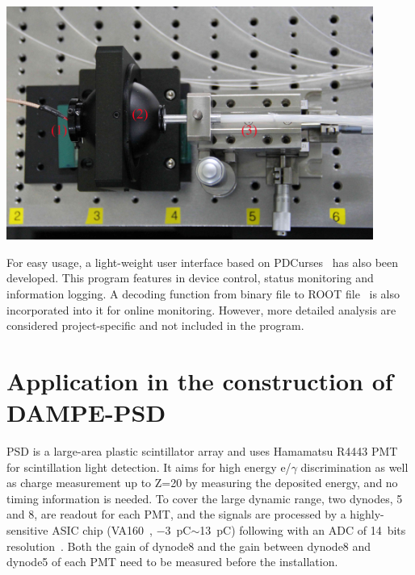 \documentclass[a4paper,10pt,twoside]{cpc-hepnp}
\begin{document}
\begin{CJK*}{UTF8}{gbsn}
\begin{multicols}{2}
\end{multicols}
\begin{center}
	\includegraphics[width=120mm]{FIG4}
\end{center}
\begin{multicols}{2}
	
For easy usage, a light-weight user interface based on PDCurses~\citep{pdcurses} has also been developed.
This program features in device control, status monitoring and information logging.
A decoding function from binary file to ROOT file~\citep{root} is also incorporated into it for online monitoring.
However, more detailed analysis are considered project-specific and not included in the program. 

\section{Application in the construction of DAMPE-PSD}
\label{sec:application}

PSD is a large-area plastic scintillator array and uses Hamamatsu R4443 PMT for scintillation light detection.
It aims for high energy e/$\gamma$ discrimination as well as charge measurement up to Z=20 by measuring the deposited energy, and no timing information is needed.
To cover the large dynamic range, two dynodes, 5 and 8, are readout for each PMT, 
and the signals are processed by a highly-sensitive ASIC chip (VA160~\citep{va160}, \SI{-3}{\pico\coulomb}$\sim$\SI{13}{\pico\coulomb}) following with an ADC of 14~bits resolution~\citep{fee}. 
Both the gain of dynode8 and the gain between dynode8 and dynode5 of each PMT need to be  measured before the installation.


\end{multicols}
\end{CJK*}
\end{document}
